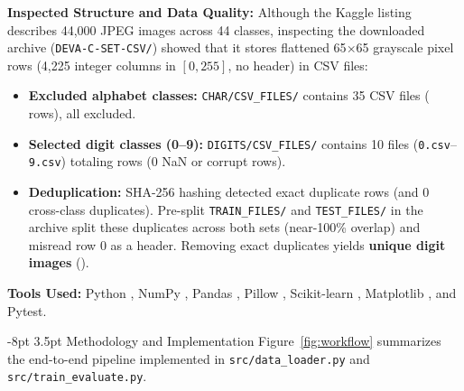 \documentclass[10pt,a4paper]{article}
\makeatletter
\renewcommand\section{\@startsection{section}{1}{\z@}%
  {-8pt \@plus -2pt \@minus -1pt}%
  {3.5pt \@plus 1pt}%
  {\normalfont\fontsize{10.8}{13}\bfseries\color{InkBlack}}}
\makeatother
\begin{document}
\textbf{Inspected Structure and Data Quality:} Although the Kaggle listing describes 44,000 JPEG images across 44 classes, inspecting the downloaded archive (\texttt{DEVA-C-SET-CSV/}) showed that it stores flattened 65$\times$65 grayscale pixel rows (4,225 integer columns in $[0,255]$, no header) in CSV files:
\begin{itemize}\itemsep1.5pt\parskip0pt
  \item \textbf{Excluded alphabet classes:} \texttt{CHAR/CSV\_FILES/} contains 35 CSV files (\TotalCharRows{} rows), all excluded.
  \item \textbf{Selected digit classes (0--9):} \texttt{DIGITS/CSV\_FILES/} contains 10 files (\texttt{0.csv}--\texttt{9.csv}) totaling \TotalRawRows{} rows (0 NaN or corrupt rows).
  \item \textbf{Deduplication:} SHA-256 hashing detected \DuplicatesRemoved{} exact duplicate rows (and 0 cross-class duplicates). Pre-split \texttt{TRAIN\_FILES/} and \texttt{TEST\_FILES/} in the archive split these duplicates across both sets (near-100\% overlap) and misread row 0 as a header. Removing exact duplicates yields \textbf{\TotalUniqueImages{} unique digit images} (\DigitCountsSummary{}).
\end{itemize}

\textbf{Tools Used:} Python \PythonVersion{}, NumPy \NumpyVersion{}, Pandas \PandasVersion{}, Pillow \PillowVersion{}, Scikit-learn \SklearnVersion{}, Matplotlib \MatplotlibVersion{}, and Pytest.

\section{Methodology and Implementation}
Figure~\ref{fig:workflow} summarizes the end-to-end pipeline implemented in \texttt{src/data\_loader.py} and \texttt{src/train\_evaluate.py}.
\end{document}
